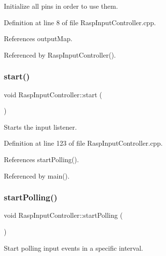 Initialize all pins in order to use them. 



Definition at line 8 of file Rasp\+Input\+Controller.\+cpp.



References output\+Map.



Referenced by Rasp\+Input\+Controller().

\mbox{\label{class_rasp_input_controller_a8cb185caa124285987d6b98122cfbea4}} 
\subsubsection{\texorpdfstring{start()}{start()}}
{\footnotesize\ttfamily void Rasp\+Input\+Controller\+::start (\begin{DoxyParamCaption}{ }\end{DoxyParamCaption})}

Starts the input listener. 

Definition at line 123 of file Rasp\+Input\+Controller.\+cpp.



References start\+Polling().



Referenced by main().

\mbox{\label{class_rasp_input_controller_a7e15590d321b382fcb5f4d70959a5cbe}} 
\subsubsection{\texorpdfstring{start\+Polling()}{startPolling()}}
{\footnotesize\ttfamily void Rasp\+Input\+Controller\+::start\+Polling (\begin{DoxyParamCaption}{ }\end{DoxyParamCaption})\hspace{0.3cm}{\ttfamily [private]}}



Start polling input events in a specific interval. 



